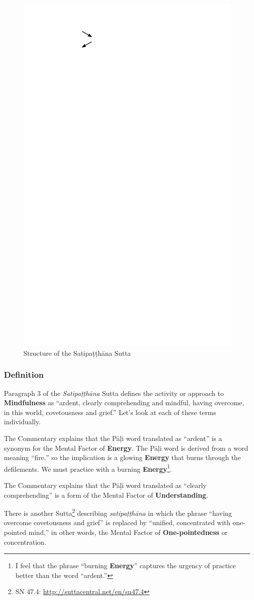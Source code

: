 \begin{figure}[h]
\centering
\includegraphics[width=0.5\linewidth]{./Diagrams/Sati}
\caption{Structure of the Satipaṭṭhāna Sutta}
\label{fig:Sati}
\end{figure}

\subsubsection*{Definition}

Paragraph 3 of the \textit{Satipaṭṭhāna} Sutta defines the activity or approach to \textbf{Mindfulness} as “ardent, clearly comprehending and mindful, having overcome, in this world, covetousness and grief.” Let’s look at each of these terms individually.

The Commentary explains that the Pāḷi word translated as “ardent” is a synonym for the Mental Factor of \textbf{Energy}. The Pāḷi word is derived from a word meaning “fire,” so the implication is a glowing \textbf{Energy} that burns through the defilements. We must practice with a burning \textbf{Energy}\footnote{I feel that the phrase “burning \textbf{Energy}” captures the urgency of practice better than the word “ardent.”}.

The Commentary explains that the Pāḷi word translated as “clearly comprehending” is a form of the Mental Factor of \textbf{Understanding}.

There is another Sutta\footnote{SN 47.4: \url{http://suttacentral.net/en/sn47.4}} describing \textit{satipaṭṭhāna} in which the phrase “having overcome covetousness and grief” is replaced by “unified, concentrated with one-pointed mind,” in other words, the Mental Factor of \textbf{One-pointedness} or concentration.

